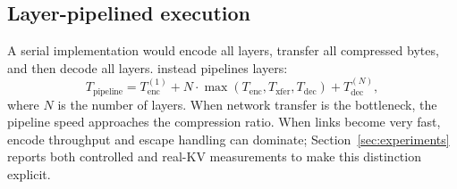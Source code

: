 \subsection{Layer-pipelined execution}

A serial implementation would encode all layers, transfer all compressed bytes, and then decode all layers. \splitzip instead pipelines layers:
\[
T_{\text{pipeline}} =
T_{\text{enc}}^{(1)} +
N \cdot \max(T_{\text{enc}},T_{\text{xfer}},T_{\text{dec}}) +
T_{\text{dec}}^{(N)},
\]
where $N$ is the number of layers. When network transfer is the bottleneck, the pipeline speed approaches the compression ratio. When links become very fast, encode throughput and escape handling can dominate; Section~\ref{sec:experiments} reports both controlled and real-KV measurements to make this distinction explicit.
